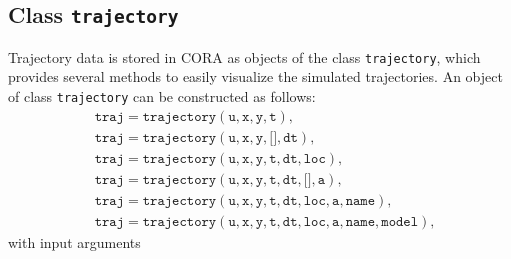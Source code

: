 \subsection{Class \texttt{trajectory}}
\label{sec:trajectory}

Trajectory data is stored in CORA as objects of the class \texttt{trajectory}, which provides several methods to easily visualize the simulated trajectories. An object of class \texttt{trajectory} can be constructed as follows:
\begin{equation*}
	\begin{split}
		& \texttt{traj} = \texttt{trajectory}(\texttt{u},\texttt{x},\texttt{y},\texttt{t}), \\
		& \texttt{traj} = \texttt{trajectory}(\texttt{u},\texttt{x},\texttt{y},\texttt{[]},\texttt{dt}), \\
		& \texttt{traj} = \texttt{trajectory}(\texttt{u},\texttt{x},\texttt{y},\texttt{t},\texttt{dt},\texttt{loc}), \\
		& \texttt{traj} = \texttt{trajectory}(\texttt{u},\texttt{x},\texttt{y},\texttt{t},\texttt{dt},\texttt{[]},\texttt{a}), \\
		& \texttt{traj} = \texttt{trajectory}(\texttt{u},\texttt{x},\texttt{y},\texttt{t},\texttt{dt},\texttt{loc},\texttt{a},\texttt{name}), \\
		& \texttt{traj} = \texttt{trajectory}(\texttt{u},\texttt{x},\texttt{y},\texttt{t},\texttt{dt},\texttt{loc},\texttt{a},\texttt{name},\texttt{model}),
	\end{split}
\end{equation*}
with input arguments
